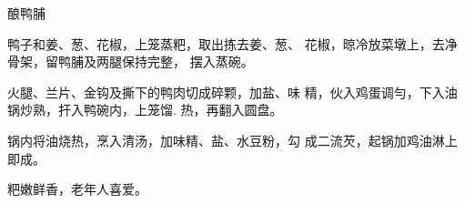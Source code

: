 \begin{recipe}{酿鸭脯}

\ingredients


\cooking

\step 鸭子和姜、葱、花椒，上笼蒸粑，取出拣去姜、葱、 花椒，晾冷放菜墩上，去净骨架，留鸭脯及两腿保持完整， 摆入蒸碗。

\step 火腿、兰片、金钩及撕下的鸭肉切成碎颗，加盐、味 精，伙入鸡蛋调勻，下入油锅炒熟，扞入鸭碗内，上笼馏. 热，再翻入圆盘。

\step 锅内将油烧热，烹入清汤，加味精、盐、水豆粉，勾 成二流芡，起锅加鸡油淋上即成。

\notes

粑嫩鲜香，老年人喜爱。

\end{recipe}

